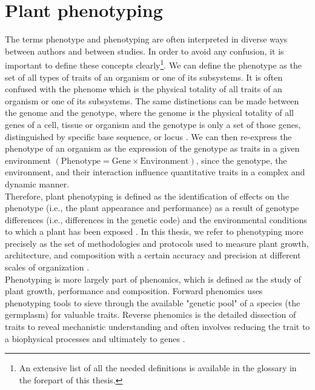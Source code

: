 \section{Plant phenotyping}
The terms phenotype and phenotyping are often interpreted in diverse ways between authors and between studies. In order to avoid any confusion, it is important to define these concepts clearly\footnote{An extensive list of all the needed definitions is available in the glossary in the forepart of this thesis.}.
We can define the phenotype as the set of all types of traits of an organism or one of its subsystems. It is often confused with the phenome which is the physical totality of all traits of an organism or one of its subsystems. The same distinctions can be made between the genome and the genotype, where the genome is the physical totality of all genes of a cell, tissue or organism and the genotype is only a set of those genes, distinguished by specific base sequence, or locus \parencite{mahner1997exactly}. We can then re-express the phenotype of an organism as the expression of the genotype as traits in a given environment $(\mathrm{Phenotype} = \mathrm{Gene} \times \mathrm{Environment})$, since the genotype, the environment, and their interaction influence quantitative traits in a complex and dynamic manner.\\
Therefore, plant phenotyping is defined as the identification of effects on the phenotype (i.e., the plant appearance and performance) as a result of genotype differences (i.e., differences in the genetic code) and the environmental conditions to which a plant has been exposed \parencite{houle_phenomics:_2010,fiorani_future_2013}. In this thesis, we refer to phenotyping more precisely as the set of methodologies and protocols used to measure plant growth, architecture, and composition with a certain accuracy and precision at different scales of organization \parencite{fiorani_future_2013}.\\
Phenotyping is more largely part of phenomics, which is defined as the study of plant growth, performance and composition. Forward phenomics uses phenotyping tools to sieve through the available "genetic pool" of a species (the germplasm) for valuable traits. Reverse phenomics is the detailed dissection of traits to reveal mechanistic understanding and often involves reducing the trait to a biophysical processes and ultimately to genes  \parencite{furbank_phenomics_2011}.\\


